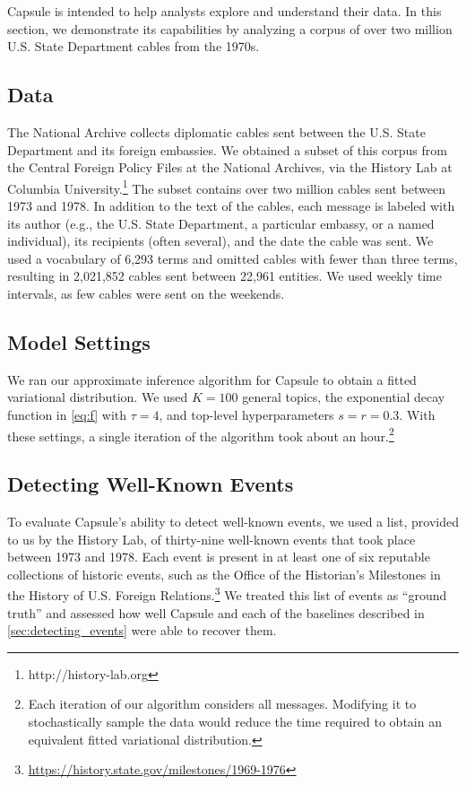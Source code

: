 Capsule is intended to help analysts explore and understand their
data. In this section, we demonstrate its capabilities by analyzing a
corpus of over two million U.S. State Department cables from the
1970s.

\subsection{Data}

The National Archive collects diplomatic cables sent between the
U.S. State Department and its foreign embassies. We obtained a subset
of this corpus from the Central Foreign Policy Files at the National
Archives, via the History Lab at Columbia
University.\footnote{http://history-lab.org} The subset contains over
two million cables sent between 1973 and 1978. In addition to the text
of the cables, each message is labeled with its author (e.g., the
U.S. State Department, a particular embassy, or a named individual),
its recipients (often several), and the date the cable was sent. We
used a vocabulary of 6,293 terms and omitted cables with fewer than
three terms, resulting in 2,021,852 cables sent between 22,961
entities. We used weekly time intervals, as few cables were sent on
the weekends.

\subsection{Model Settings}

We ran our approximate inference algorithm for Capsule to obtain a
fitted variational distribution. We used $K=100$ general topics, the
exponential decay function in \cref{eq:f} with $\tau=4$, and top-level
hyperparameters $s=r=0.3$. With these settings, a single iteration of
the algorithm took about an hour.\footnote{Each iteration of our
  algorithm considers all messages. Modifying it to stochastically
  sample the data would reduce the time required to obtain an
  equivalent fitted variational distribution.}

\subsection{Detecting Well-Known Events}

To evaluate Capsule's ability to detect well-known events, we used a
list, provided to us by the History Lab, of thirty-nine well-known
events that took place between 1973 and 1978. Each event is present in
at least one of six reputable collections of historic events, such as
the Office of the Historian's Milestones in the History of
U.S. Foreign
Relations.\footnote{\url{https://history.state.gov/milestones/1969-1976}}
We treated this list of events as ``ground truth'' and assessed how
well Capsule and each of the baselines described in
\cref{sec:detecting_events} were able to recover them.

